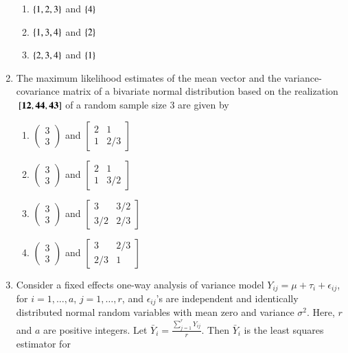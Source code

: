 \documentclass[journal]{IEEEtran}
\begin{document}
\begin{enumerate}
\begin{enumerate}
    \item $\left\{1, 2, 3\right\}$ and $\left\{4\right\}$
    \item $\left\{1, 3, 4\right\}$ and $\left\{2\right\}$
    \item $\left\{2, 3, 4\right\}$ and $\left\{1\right\}$
\end{enumerate}
\item The maximum likelihood estimates of the mean vector and the variance-covariance matrix of a bivariate normal distribution based on the realization ${}\left[\mathbf{1\\2}, \mathbf{4\\4}, \mathbf{4\\3}\right]$ of a random sample size 3 are given by
\begin{enumerate}
    \item $\begin{pmatrix} 3 \\ 3 \end{pmatrix}$ and $\begin{bmatrix} 2 & 1 \\ 1 & 2/3 \end{bmatrix}$
    \item $\begin{pmatrix} 3 \\ 3 \end{pmatrix}$ and $\begin{bmatrix} 2 & 1 \\ 1 & 3/2 \end{bmatrix}$
    \item $\begin{pmatrix} 3 \\ 3 \end{pmatrix}$ and $\begin{bmatrix} 3 & 3/2 \\ 3/2 & 2/3 \end{bmatrix}$
    \item $\begin{pmatrix} 3 \\ 3 \end{pmatrix}$ and $\begin{bmatrix} 3 & 2/3 \\ 2/3 & 1 \end{bmatrix}$
\end{enumerate}
\item Consider a fixed effects one-way analysis of variance model $Y_{ij} = \mu + \tau_i + \epsilon_{ij}$, for $i = 1, \dots, a$, $j = 1, \dots, r$, and $\epsilon_{ij}$'s are independent and identically distributed normal random variables with mean zero and variance $\sigma^2$. Here, $r$ and $a$ are positive integers. Let $\bar{Y}_i = \frac{\sum_{j=1}^r Y_{ij}}{r}$. Then $\bar{Y}_i$ is the least squares estimator for

\end{enumerate}
\end{document}
